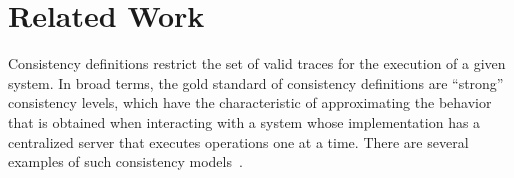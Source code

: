 \documentclass[journal,compsoc]{IEEEtran}
\begin{document}

 \section{Related Work} \label{sec:related}
 Consistency definitions restrict the set of valid traces for the execution of a given system. %
 In broad terms, the gold standard of consistency definitions are ``strong'' consistency levels, which have the characteristic of approximating the behavior that is obtained when interacting with a system whose implementation has a  centralized server that executes operations one at a time. There are several examples of such consistency models~\cite{Attiya:1994:SCV:176575.176576, Herlihy:1990:LCC:78969.78972, Lamport:1979:MMC:1311099.1311750, opac-b1024856, Mizuno1995, Raynal1995}.
\end{document}
